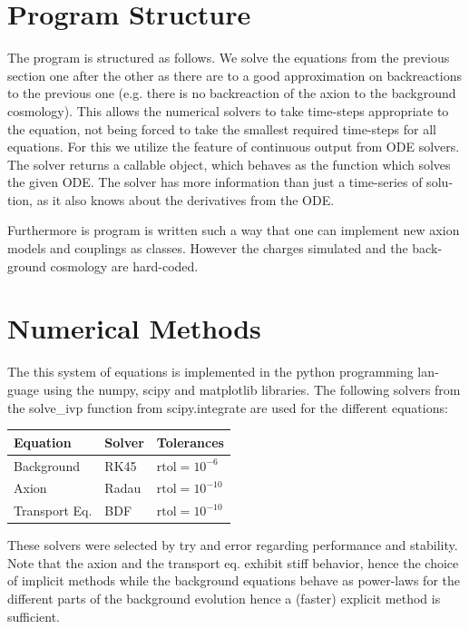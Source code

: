 \documentclass[master,       %
               twoside,        %
               BCOR10mm,       %
               english,ngerman, %
               ]{GAUBM}
\begin{document}
\begin{otherlanguage}{english}
\section{Program Structure}
The program is structured as follows.
We solve the equations from the previous section one after the other as there are to a good approximation on backreactions to the previous one (e.g. there is no backreaction of the axion to the background cosmology).
This allows the numerical solvers to take time-steps appropriate to the equation, not being forced to take the smallest required time-steps for all equations.
For this we utilize the feature of continuous output from ODE solvers. The solver returns a callable object, which behaves as the function which solves the given ODE. The solver has more information than just a time-series of solution, as it also knows about the derivatives from the ODE.

Furthermore is program is written such a way that one can implement new axion models and couplings as classes.
However the charges simulated and the background cosmology are hard-coded.

\section{Numerical Methods}
The this system of equations is implemented in the python programming language using the numpy, scipy and matplotlib libraries.
The following solvers from the solve\_ivp function from scipy.integrate are used for the different equations:
\begin{table}[H]
	\begin{center}
		\begin{tabular}{lll}
			Equation & Solver & Tolerances \\
			\hline
			 Background & RK45 & $\mathrm{rtol} = 10^{-6}$ \\
			 Axion & Radau & $\mathrm{rtol} = 10^{-10}$ \\
			 Transport Eq. & BDF & $\mathrm{rtol} = 10^{-10}$ \\
		\end{tabular}
	\end{center}
\end{table}
These solvers were selected by try and error regarding performance and stability. Note that the axion and the transport eq. exhibit stiff behavior, hence the choice of implicit methods while the background equations behave as power-laws for the different parts of the background evolution hence a (faster) explicit method is sufficient.


\end{otherlanguage}
\end{document}
